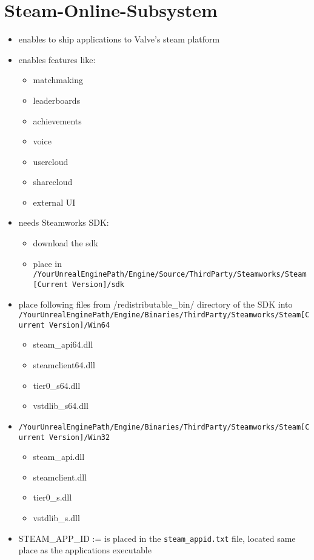 \chapter{Steam-Online-Subsystem}
    \begin{itemize}
        \item enables to ship applications to Valve's steam platform
        \item enables features like:
        \begin{itemize}
            \item matchmaking
            \item leaderboards
            \item achievements
            \item voice
            \item usercloud
            \item sharecloud
            \item external UI
        \end{itemize}
        \item needs Steamworks SDK:
        \begin{itemize}
            \item download the sdk
            \item place in \colorbox{mygray}{\lstinline{/YourUnrealEnginePath/Engine/Source/ThirdParty/Steamworks/Steam[Current Version]/sdk}}
        \end{itemize}
        \item place following files from /redistributable_bin/ directory of the SDK  into \colorbox{mygray}{\lstinline{/YourUnrealEnginePath/Engine/Binaries/ThirdParty/Steamworks/Steam[Current Version]/Win64}}
        \begin{itemize}
            \item steam_api64.dll
            \item steamclient64.dll
            \item tier0_s64.dll
            \item vstdlib_s64.dll
        \end{itemize}
        \item \colorbox{mygray}{\lstinline{/YourUnrealEnginePath/Engine/Binaries/ThirdParty/Steamworks/Steam[Current Version]/Win32}}
        \begin{itemize}
            \item steam_api.dll
            \item steamclient.dll
            \item tier0_s.dll
            \item vstdlib_s.dll 
        \end{itemize}
        \item STEAM_APP_ID := is placed in the \colorbox{mygray}{\lstinline{steam_appid.txt}} file, located same place as the applications executable
    \end{itemize}
